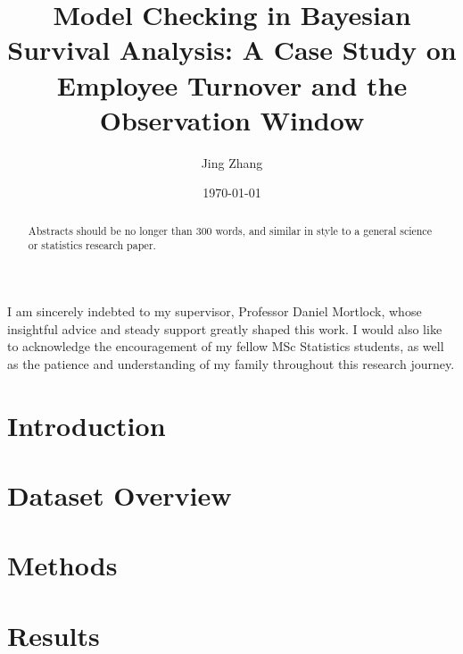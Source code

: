 \documentclass{statsmsc}
\title{Model Checking in Bayesian Survival Analysis: A Case Study on Employee Turnover and the Observation Window}
\author{Jing Zhang}
\date{\today}
\begin{document}
\maketitle

\declarationdate{\today}%
\declaration 


\begin{acknowledgements}
I am sincerely indebted to my supervisor, Professor Daniel Mortlock, whose insightful advice and steady support greatly shaped this work. I would also like to acknowledge the encouragement of my fellow MSc Statistics students, as well as the patience and understanding of my family throughout this research journey.
\end{acknowledgements}
\clearpage

\begin{abstract}
    Abstracts should be no longer than 300 words, and similar in style to a general science or statistics research paper.
\end{abstract}

\setcounter{tocdepth}{2} 
\tableofcontents
\clearpage
\mainmatter

%

\section{Introduction}

\section{Dataset Overview}

\section{Methods}\label{sec:methods}

\section{Results}
\label{sec:results}

\end{document}
